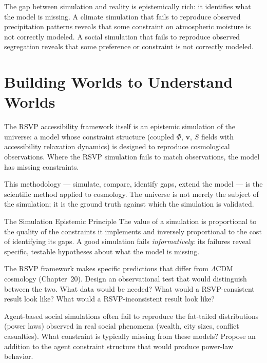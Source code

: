 The gap between simulation and reality is epistemically rich: it
identifies what the model is missing. A climate simulation that
fails to reproduce observed precipitation patterns reveals that
some constraint on atmospheric moisture is not correctly modeled.
A social simulation that fails to reproduce observed segregation
reveals that some preference or constraint is not correctly modeled.

\section{Building Worlds to Understand Worlds}

The RSVP accessibility framework itself is an epistemic simulation
of the universe: a model whose constraint structure (coupled $\Phi$,
$\mathbf{v}$, $S$ fields with accessibility relaxation dynamics)
is designed to reproduce cosmological observations. Where the RSVP
simulation fails to match observations, the model has missing constraints.

This methodology — simulate, compare, identify gaps, extend the model —
is the scientific method applied to cosmology. The universe is not merely
the subject of the simulation; it is the ground truth against which the
simulation is validated.

\begin{namedthm}{The Simulation Epistemic Principle}
  The value of a simulation is proportional to the quality of the
  constraints it implements and inversely proportional to the
  cost of identifying its gaps. A good simulation fails
  \emph{informatively}: its failures reveal specific, testable
  hypotheses about what the model is missing.
\end{namedthm}

\begin{exercise}
  The RSVP framework makes specific predictions that differ from
  $\Lambda$CDM cosmology (Chapter~20). Design an observational test
  that would distinguish between the two. What data would be needed?
  What would a RSVP-consistent result look like? What would a
  RSVP-inconsistent result look like?
\end{exercise}

\begin{exercise}
  Agent-based social simulations often fail to reproduce the fat-tailed
  distributions (power laws) observed in real social phenomena
  (wealth, city sizes, conflict casualties). What constraint is typically
  missing from these models? Propose an addition to the agent constraint
  structure that would produce power-law behavior.
\end{exercise}
